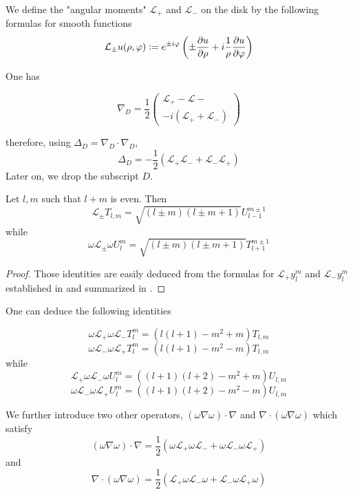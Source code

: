 \documentclass[]{article}
\begin{document}
\begin{Def}
	We define the "angular moments" $\mathcal{L}_+$ and $\mathcal{L}_-$ on the disk by the following formulas for smooth functions
	\[\mathcal{L}_\pm u(\rho,\varphi) \mathrel{\mathop:}= e^{\pm i \varphi}\left(\pm \frac{\partial u}{\partial\rho} + i \frac{1}{\rho}\frac{\partial u}{\partial \varphi}\right)\]
\end{Def}

One has

\[\nabla_D = \frac{1}{2}\begin{pmatrix}\mathcal{L}_+ - \mathcal{L}- \\ -i(\mathcal{L}_+ + \mathcal{L}_-)  \end{pmatrix}\]

therefore, using $\Delta_D = \nabla_D \cdot \nabla_D$, 
\[\Delta_D = -\frac{1}{2}(\mathcal{L}_+ \mathcal{L}_{-} + \mathcal{L}_{-}\mathcal{L}_+)\]
Later on, we drop the subscript $D$. 
\begin{Prop}
	Let $l,m$ such that $l+m$ is even. Then 
	\[\mathcal{L}_{\pm} T_{l,m} = \sqrt{(l\pm m)(l\pm m+1)}U_{l-1}^{m \pm 1}\]
	while
	\[\omega \mathcal{L}_\pm \omega U_{l}^m = \sqrt{(l \pm m)(l\pm m +1)} T_{l+1}^{m \pm 1}\]
\end{Prop}
\begin{proof}
	Those identities are easily deduced from the formulas for $\mathcal{L}_{+} y_{l}^m$ and $\mathcal{L}_- y_{l}^m$ established in \cite{ramaciotti2016theoretical} and summarized in \cite{hiptmair2017closed}.
\end{proof}
One can deduce the following identities

\begin{Cor}
	\[\omega \mathcal{L}_{+} \omega \mathcal{L}_{-} T_{l}^m = (l(l+1) - m^2 + m)T_{l,m} \]
	\[\omega \mathcal{L}_{-} \omega \mathcal{L}_{+} T_{l}^m = (l(l+1) - m^2 - m)T_{l,m} \]
	while
	\[\mathcal{L}_{+} \omega \mathcal{L}_{-}\omega U_{l}^m = ((l+1)(l+2) - m^2 + m)U_{l,m} \]
	\[\omega \mathcal{L}_{-} \omega \mathcal{L}_{+} U_{l}^m = ((l+1)(l+2) - m^2 - m)U_{l,m} \]
\end{Cor}

We further introduce two other operators, $(\omega \nabla \omega) \cdot \nabla $ and $\nabla \cdot (\omega \nabla \omega)$ which satisfy 
\[(\omega \nabla \omega) \cdot \nabla = \frac{1}{2}\left(\omega \mathcal{L}_{+} \omega \mathcal{L}_{-} + \omega \mathcal{L}_{-} \omega \mathcal{L}_{+}\right)\]
and
\[\nabla \cdot (\omega \nabla \omega)  = \frac{1}{2}\left( \mathcal{L}_{+} \omega \mathcal{L}_{-}\omega + \mathcal{L}_{-} \omega \mathcal{L}_{+}\omega \right)\]
\end{document}
